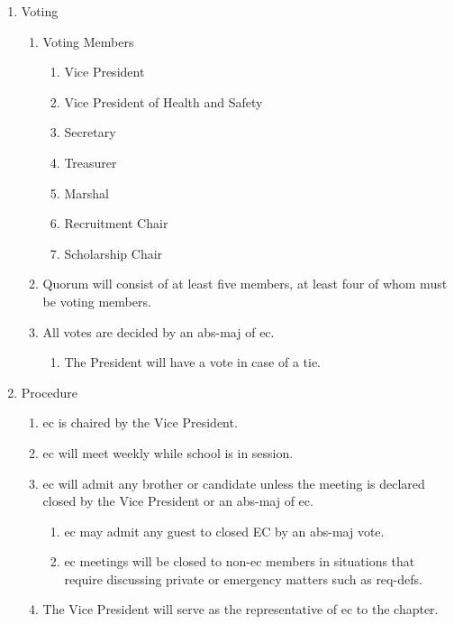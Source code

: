 \begin{enumerate}
		\item Voting
			\begin{enumerate}
				\item Voting Members
					\begin{enumerate}
						\item Vice President
						\item Vice President of Health and Safety
						\item Secretary
						\item Treasurer
						\item Marshal
						\item Recruitment Chair
                        \item Scholarship Chair
					\end{enumerate}
				\item Quorum will consist of at least five members, at least four of whom must be voting members.
				\item All votes are decided by an \gls{abs-maj} of \gls{ec}.
                \begin{enumerate}
                    \item The President will have a vote in case of a tie.
                \end{enumerate}
			\end{enumerate}
		\item Procedure
			\begin{enumerate}
				\item \gls{ec} is chaired by the Vice President.
				\item \gls{ec} will meet weekly while school is in session.
				\item \gls{ec} will admit any brother or candidate unless the meeting is declared closed by the Vice President or an \gls{abs-maj} of \gls{ec}.
					\begin{enumerate}
                        			\item \gls{ec} may admit any guest to closed EC by an \gls{abs-maj} vote.
						\item \gls{ec} meetings will be closed to non-\gls{ec} members in situations that require discussing private or emergency matters such as \glspl{req-def}.
					\end{enumerate}
				\item The Vice President will serve as the representative of \gls{ec} to the chapter.
			\end{enumerate}
	\end{enumerate}

